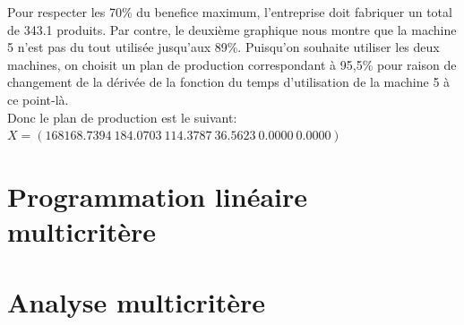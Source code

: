 \documentclass[a4paper, 11pt]{article}
\begin{document}
Pour respecter les 70\% du benefice maximum, l’entreprise doit fabriquer un
total de 343.1 produits. Par contre, le deuxième graphique nous montre que la
machine 5 n’est pas du tout utilisée jusqu’aux 89\%. Puisqu’on souhaite
utiliser les deux machines, on choisit un plan de production correspondant à
95,5\% pour raison de changement de la dérivée de la fonction du temps
d’utilisation de la machine 5 à ce point-là. \\

Donc le plan de production est le suivant: \\
$X = (168 168.7394~ 184.0703~ 114.3787~ 36.5623~ 0.0000~ 0.0000)$

\section{Programmation linéaire multicritère}


\section{Analyse multicritère}
\end{document}
